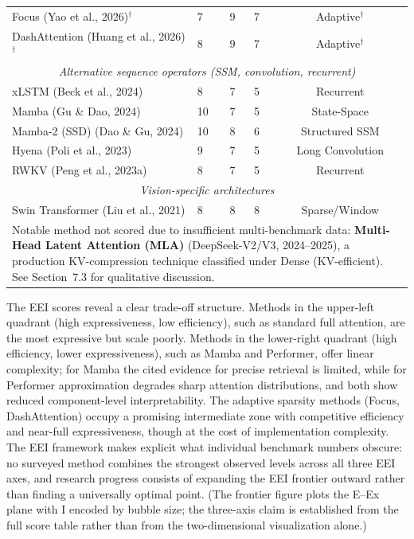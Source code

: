 \documentclass[10pt,twocolumn]{article}
\begin{document}
\begin{table}[!tbp]
\begin{tabular}{p{2.5cm}p{1.2cm}p{1.5cm}p{1.5cm}c}
Focus (Yao et al., 2026)$^\dagger$ & 7 & 9 & 7 & Adaptive$^\dagger$ \\
DashAttention (Huang et al., 2026)$^\dagger$ & 8 & 9 & 7 & Adaptive$^\dagger$ \\
\midrule
\multicolumn{5}{c}{\emph{Alternative sequence operators (SSM, convolution, recurrent)}} \\
xLSTM (Beck et al., 2024) & 8 & 7 & 5 & Recurrent \\
Mamba (Gu \& Dao, 2024) & 10 & 7 & 5 & State-Space \\
Mamba-2 (SSD) (Dao \& Gu, 2024) & 10 & 8 & 6 & Structured SSM \\
Hyena (Poli et al., 2023) & 9 & 7 & 5 & Long Convolution \\
RWKV (Peng et al., 2023a) & 8 & 7 & 5 & Recurrent \\
\midrule
\multicolumn{5}{c}{\emph{Vision-specific architectures}} \\
Swin Transformer (Liu et al., 2021) & 8 & 8 & 8 & Sparse/Window \\
\bottomrule
\multicolumn{5}{p{10cm}}{\scriptsize Notable method not scored due to insufficient multi-benchmark data: \textbf{Multi-Head Latent Attention (MLA)} (DeepSeek-V2/V3, 2024--2025), a production KV-compression technique classified under Dense (KV-efficient). See Section~7.3 for qualitative discussion.}
\end{tabular}
\end{table}


The EEI scores reveal a clear trade-off structure. Methods in the upper-left quadrant (high expressiveness, low efficiency), such as standard full attention, are the most expressive but scale poorly. Methods in the lower-right quadrant (high efficiency, lower expressiveness), such as Mamba and Performer, offer linear complexity; for Mamba the cited evidence for precise retrieval is limited, while for Performer approximation degrades sharp attention distributions, and both show reduced component-level interpretability. The adaptive sparsity methods (Focus, DashAttention) occupy a promising intermediate zone with competitive efficiency and near-full expressiveness, though at the cost of implementation complexity. The EEI framework makes explicit what individual benchmark numbers obscure: no surveyed method combines the strongest observed levels across all three EEI axes, and research progress consists of expanding the EEI frontier outward rather than finding a universally optimal point. (The frontier figure plots the E--Ex plane with I encoded by bubble size; the three-axis claim is established from the full score table rather than from the two-dimensional visualization alone.)
\end{document}
